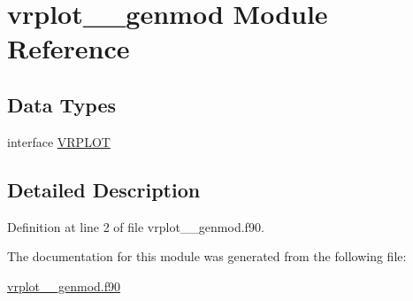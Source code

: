 \hypertarget{classvrplot____genmod}{\section{vrplot\+\_\+\+\_\+genmod Module Reference}
\label{classvrplot____genmod}
}
\subsection*{Data Types}
\begin{DoxyCompactItemize}
\item 
interface \hyperlink{interfacevrplot____genmod_1_1VRPLOT}{V\+R\+P\+L\+O\+T}
\end{DoxyCompactItemize}


\subsection{Detailed Description}


Definition at line 2 of file vrplot\+\_\+\+\_\+genmod.\+f90.



The documentation for this module was generated from the following file\+:\begin{DoxyCompactItemize}
\item 
\hyperlink{vrplot____genmod_8f90}{vrplot\+\_\+\+\_\+genmod.\+f90}\end{DoxyCompactItemize}
